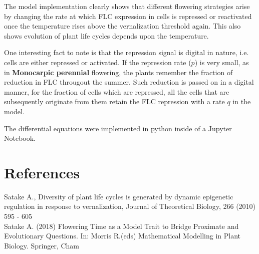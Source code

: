 \documentclass[10 pt]{article}
\begin{document}
The model implementation clearly shows that different flowering strategies arise by changing the rate at which FLC expression in cells is repressed or reactivated once the temperature rises above the vernalization threshold again. This also shows evolution of plant life cycles depends upon the temperature. 

One interesting fact to note is that the repression signal is digital in nature, i.e. cells are either repressed or activated. If the repression rate ($p$) is very small, as in \textbf{Monocarpic perennial} flowering, the plants remember the fraction of reduction in FLC througout the summer. Such reduction is passed on in a digital manner, for the fraction of cells which are repressed, all the cells that are subsequently originate from them retain the FLC repression with a rate $q$ in the model.

The differential equations were implemented in python inside of a Jupyter Notebook.

\section{References}

Satake A., Diversity of plant life cycles is generated by dynamic epigenetic regulation in response to vernalization, Journal of Theoretical Biology, 266 (2010) 595 - 605\\%
Satake A. (2018) Flowering Time as a Model Trait to Bridge Proximate and Evolutionary Questions. In: Morris R.(eds) Mathematical Modelling in Plant Biology. Springer, Cham%
\end{document}
